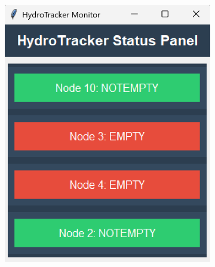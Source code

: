\begin{figure}[H]
    \centering
    \begin{subfigure}[b]{0.45\linewidth}
        \centering
        \includegraphics[width=\linewidth]{gui_images/gui_screenshot_1.png}
        \caption{}
        \label{fig:subfig1}
    \end{subfigure}
    \hfill
    \begin{subfigure}[b]{0.45\linewidth}
        \centering

\end{subfigure}
\end{figure}
